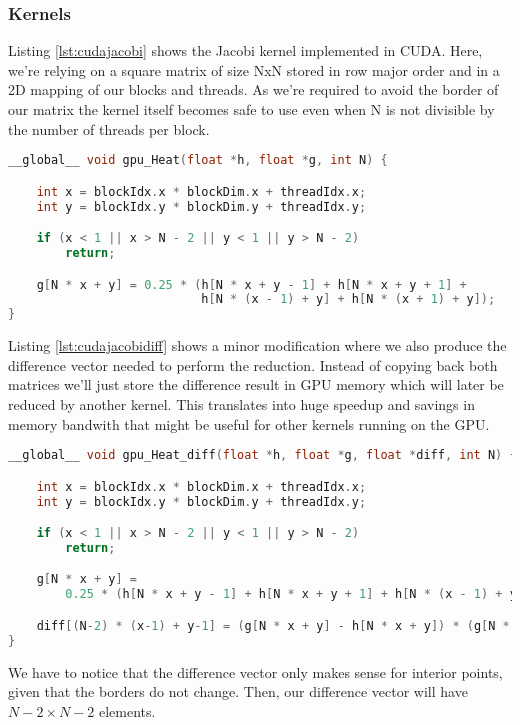 \documentclass[a4paper, 10pt]{article}
\begin{document}
\subsubsection{Kernels}
Listing \ref{lst:cudajacobi} shows the Jacobi kernel implemented in CUDA. Here, we're relying on a square matrix of size NxN stored in row major order and in a 2D mapping of our blocks and threads. As we're required to avoid the border of our matrix the kernel itself becomes safe to use even when N is not divisible by the number of threads per block.
\begin{lstlisting}[language=c, caption={Jacobi kernel}, label={lst:cudajacobi}]
__global__ void gpu_Heat(float *h, float *g, int N) {

    int x = blockIdx.x * blockDim.x + threadIdx.x;
    int y = blockIdx.y * blockDim.y + threadIdx.y;

    if (x < 1 || x > N - 2 || y < 1 || y > N - 2)
        return;

    g[N * x + y] = 0.25 * (h[N * x + y - 1] + h[N * x + y + 1] + 
                           h[N * (x - 1) + y] + h[N * (x + 1) + y]);
}
\end{lstlisting}

Listing \ref{lst:cudajacobidiff} shows a minor modification where we also produce the difference vector needed to perform the reduction. Instead of copying back both matrices we'll just store the difference result in GPU memory which will later be reduced by another kernel. This translates into huge speedup and savings in memory bandwith that might be useful for other kernels running on the GPU.
\begin{lstlisting}[language=c, caption={Jacobi with difference vector as output}, label={lst:cudajacobidiff}]
__global__ void gpu_Heat_diff(float *h, float *g, float *diff, int N) {

    int x = blockIdx.x * blockDim.x + threadIdx.x;
    int y = blockIdx.y * blockDim.y + threadIdx.y;

    if (x < 1 || x > N - 2 || y < 1 || y > N - 2)
        return;

    g[N * x + y] =
        0.25 * (h[N * x + y - 1] + h[N * x + y + 1] + h[N * (x - 1) + y] + h[N * (x + 1) + y]);

    diff[(N-2) * (x-1) + y-1] = (g[N * x + y] - h[N * x + y]) * (g[N * x + y] - h[N * x + y]);
}

\end{lstlisting}

We have to notice that the difference vector only makes sense for interior points, given that the borders do not change. Then, our difference vector will have $N-2\times N-2$ elements.
\end{document}
